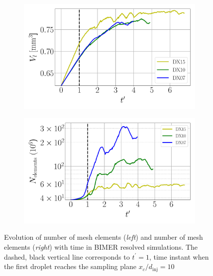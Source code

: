 \begin{figure}[ht]
\centering
\begin{subfigure}[b]{0.45\textwidth}
	\centering
   \includegraphics[scale=0.24]{./part3_applications/figures_ch8_resolved/BIMER_liquid_volume_increase}
   \label{fig:BIMER_liquid_volume_evolution} 
\end{subfigure}
\hfill
\begin{subfigure}[b]{0.45\textwidth}
	\centering
   \includegraphics[scale=0.24]{./part3_applications/figures_ch8_resolved/BIMER_nelem_increase}
   \label{fig:BIMER_nelem_increase}
\end{subfigure}
	\vspace*{-0.25in}
   \caption[Evolution of number of mesh elements (\textsl{left}) and number of mesh elements (\textsl{right}) with time in BIMER resolved simulations]{Evolution of number of mesh elements (\textsl{left}) and number of mesh elements (\textsl{right}) with time in BIMER resolved simulations. The dashed, black vertical line corresponds to $t^\prime = 1$, time instant when the first droplet reaches the sampling plane $x_c/d_\mathrm{inj} = 10$}
\label{fig:BIMER_volume_nelem_evolution}
\end{figure}

